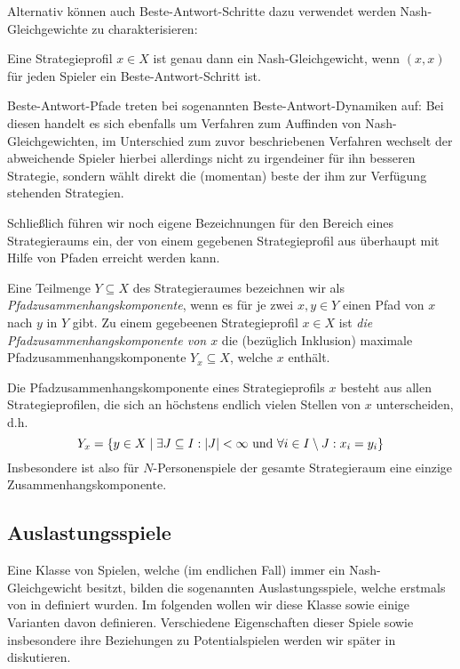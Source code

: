 Alternativ können auch Beste-Antwort-Schritte dazu verwendet werden Nash-Gleichgewichte zu charakterisieren:

\begin{beob}\label{beob:BASchritteNG}
	Eine Strategieprofil $x \in X$ ist genau dann ein Nash-Gleichgewicht, wenn $(x,x)$ für jeden Spieler ein Beste-Antwort-Schritt ist.
\end{beob}

Beste-Antwort-Pfade treten bei sogenannten Beste-Antwort-Dynamiken auf: Bei diesen handelt es sich ebenfalls um Verfahren zum Auffinden von Nash-Gleichgewichten, im Unterschied zum zuvor beschriebenen Verfahren wechselt der abweichende Spieler hierbei allerdings nicht zu irgendeiner für ihn besseren Strategie, sondern wählt direkt die (momentan) beste der ihm zur Verfügung stehenden Strategien. 

Schließlich führen wir noch eigene Bezeichnungen für den Bereich eines Strategieraums ein, der von einem gegebenen Strategieprofil aus überhaupt mit Hilfe von Pfaden erreicht werden kann. 

\begin{defn}
	Eine Teilmenge $Y \subseteq X$ des Strategieraumes bezeichnen wir als \emph{Pfadzusammenhangskomponente}, wenn es für je zwei $x, y \in Y$ einen Pfad von $x$ nach $y$ in $Y$ gibt. Zu einem gegebeenen Strategieprofil $x \in X$ ist \emph{die Pfadzusammenhangskomponente von $x$} die (bezüglich Inklusion) maximale Pfadzusammenhangskomponente $Y_x \subseteq X$, welche $x$ enthält.
\end{defn}

\begin{beob}
	Die Pfadzusammenhangskomponente eines Strategieprofils $x$ besteht aus allen Strategieprofilen, die sich an höchstens endlich vielen Stellen von $x$ unterscheiden, d.h.
	\[Y_x = \left\{y \in X \mid \exists J \subseteq I: \left|J\right| < \infty \text{ und } \forall i \in I\setminus J: x_i = y_i \right\} \]
	Insbesondere ist also für $N$-Personenspiele der gesamte Strategieraum eine einzige Zusammenhangskomponente.
\end{beob}


\subsection{Auslastungsspiele}

Eine Klasse von Spielen, welche (im endlichen Fall) immer ein Nash-Gleichgewicht besitzt, bilden die sogenannten Auslastungsspiele, welche erstmals von \citeauthor{RosenthalPotential} in \cite{RosenthalPotential} definiert wurden. Im folgenden wollen wir diese Klasse sowie einige Varianten davon definieren. Verschiedene Eigenschaften dieser Spiele sowie insbesondere ihre Beziehungen zu Potentialspielen werden wir später in  diskutieren.


